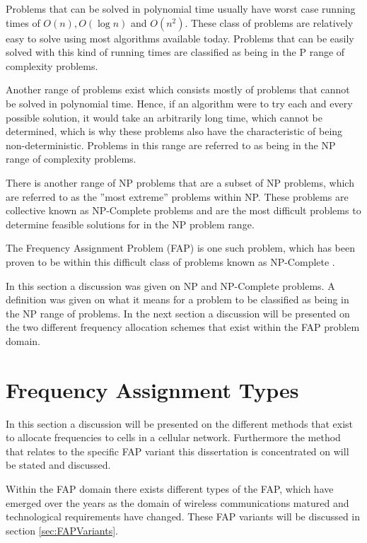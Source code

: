 Problems that can be solved in polynomial time usually have worst case running times of $O(n),O(\log n)$ and $O(n^2)$. These class of problems are relatively easy to solve using most algorithms available today. Problems that can be easily solved with this kind of running times are classified as being in the P range of complexity problems\cite{AIModernApproach}.

Another range of problems exist which consists mostly of problems that cannot be solved in polynomial time. Hence, if an algorithm were to try each and every possible solution, it would take an arbitrarily long time, which cannot be determined, which is why these problems also have the characteristic of being non-deterministic. Problems in this range are referred to as being in the NP range of complexity problems\cite{AIModernApproach}.

There is another range of NP problems that are a subset of NP problems, which are referred to as the ''most extreme'' problems within NP.  These problems are collective known as NP-Complete problems and are the most difficult problems to determine feasible solutions for in the NP problem range\cite{AIModernApproach}.

The Frequency Assignment Problem (FAP) is one such problem, which has been proven to be within this difficult class of problems known as NP-Complete \cite{MontemanniThesis,Eisenblatter,Karen2004,AndreasPaper,FixedFAPPSO}.

In this section a discussion was given on NP and NP-Complete problems. A definition was given on what it means for a problem to be classified as being in the NP range of problems. In the next section a discussion will be presented on the two different frequency allocation schemes that exist within the FAP problem domain.
\section{Frequency Assignment Types}
\label{sec:FreqAssignmentTypes}
In this section a discussion will be presented on the different methods that exist to allocate frequencies to cells in a cellular network. Furthermore the method that relates to the specific FAP variant this dissertation is concentrated on will be stated and discussed.

Within the FAP domain there exists different types of the FAP, which have emerged over the years as the domain of wireless communications matured and technological requirements have changed. These FAP variants will be discussed in section \ref{sec:FAPVariants}.

